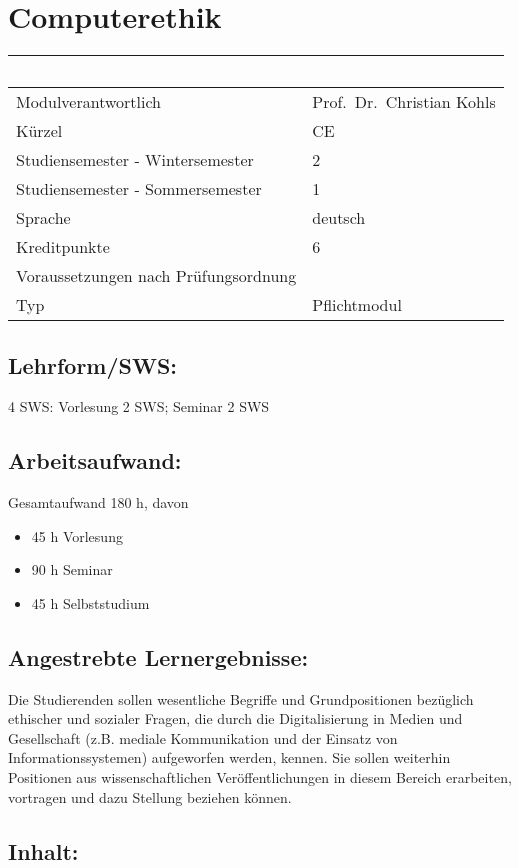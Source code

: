 \chapter{Computerethik}\label{computerethik}

\begin{longtable}[]{@{}ll@{}}
\toprule
~ & ~\tabularnewline
\midrule
\endhead
Modulverantwortlich & Prof.~Dr.~Christian Kohls\tabularnewline
Kürzel & CE\tabularnewline
Studiensemester - Wintersemester & 2\tabularnewline
Studiensemester - Sommersemester & 1\tabularnewline
Sprache & deutsch\tabularnewline
Kreditpunkte & 6\tabularnewline
Voraussetzungen nach Prüfungsordnung &\tabularnewline
Typ & Pflichtmodul\tabularnewline
\bottomrule
\end{longtable}

\section*{Lehrform/SWS:}\label{lehrformsws}

4 SWS: Vorlesung 2 SWS; Seminar 2 SWS

\section*{Arbeitsaufwand:}\label{arbeitsaufwand}

Gesamtaufwand 180 h, davon

\begin{itemize}
\item
  45 h Vorlesung
\item
  90 h Seminar
\item
  45 h Selbststudium
\end{itemize}

\section*{Angestrebte
Lernergebnisse:}\label{angestrebte-lernergebnisse}

Die Studierenden sollen wesentliche Begriffe und Grundpositionen
bezüglich ethischer und sozialer Fragen, die durch die Digitalisierung
in Medien und Gesellschaft (z.B. mediale Kommunikation und der Einsatz
von Informationssystemen) aufgeworfen werden, kennen. Sie sollen
weiterhin Positionen aus wissenschaftlichen Veröffentlichungen in diesem
Bereich erarbeiten, vortragen und dazu Stellung beziehen können.

\section*{Inhalt:}\label{inhalt}

